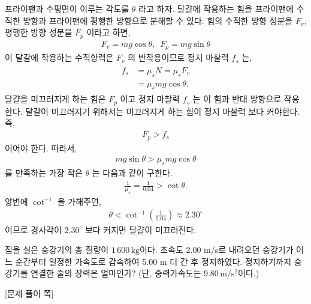 \documentclass[floatfix,nofootinbib,superscriptaddress,fleqn,preprint]{revtex4}
\begin{document}
프라이팬과 수평면이 이루는 각도를 $\theta$ 라고 하자. 달걀에 작용하는 힘을
프라이팬에 수직한 방향과 프라이팬에 평행한 방향으로 분해할 수 있다. 힘의 수직한
방향 성분을 $F_v$, 평행한 방향 성분을 $F_p$ 이라고 하면,
\begin{align}
F_v = mg\cos{\theta},\,\,\,F_p = mg\sin{\theta}  
\end{align} 
이 달걀에 작용하는 수직항력은 $F_v$ 의 반작용이므로 정지 마찰력 $f_s$ 는,
\begin{align}
  \begin{split}
    f_s &= \mu_s N = \mu_s F_v \\
    &= \mu_s mg\cos{\theta}.
  \end{split}
\end{align} 
달걀을 미끄러지게 하는 힘은 $F_p$ 이고 정지 마찰력 $f_s$ 는 이 힘과 반대 방향으로
작용한다. 달걀이 미끄러지기 위해서는 미끄러지게 하는 힘이 정지 마찰력 보다 커야한다. 즉,
\begin{align}
  F_p > f_s
\end{align}
이어야 한다. 따라서,
\begin{align}
  mg\sin{\theta}  > \mu_s mg\cos{\theta}
\end{align}
를 만족하는 가장 작은 $\theta$ 는 다음과 같이 구한다.
\begin{align}
  \frac{1}{\mu_s} = \frac{1}{0.04} > \cot{\theta} .
\end{align}
양변에 $\cot^{-1}$ 을 가해주면,
  \begin{align}
  \theta < \cot^{-1}{\left(\frac{1}{0.04}\right)} \approx 2.30^\circ
\end{align}
이므로 경사각이 $2.30^\circ$ 보다 커지면 달걀이 미끄러진다.
\vspace{2cm}

짐을 실은 승강기의 총 질량이 
$1\,600\,\mathrm{kg}$이다. 초속도 2.00 m/s로 내려오던 승강기가 어느
순간부터 일정한 가속도로 감속하여 5.00 m 더 간 후
정지하였다. 정지하기까지 승강기를 연결한 줄의 장력은 얼마인가? (단,
중력가속도는 $9.80\,\mathrm{m/s^2}$이다.)   
\newpage

{\color{gray} [문제 풀이 쪽]}

\newpage
\end{document}
